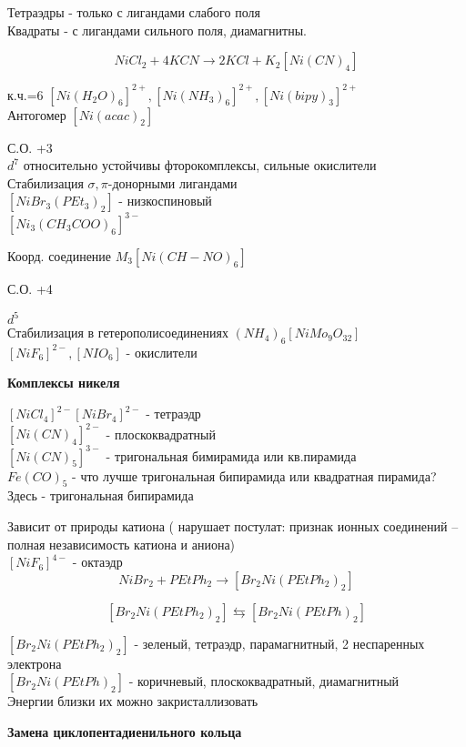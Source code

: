 Тетраэдры - только с лигандами слабого поля\\
Квадраты - с лигандами сильного поля, диамагнитны.

$$NiCl_2 + 4KCN \rightarrow 2KCl + K_2[Ni(CN)_4]$$

к.ч.=6 $[Ni(H_2O)_6]^{2+}, [Ni(NH_3)_6]^{2+}, [Ni(bipy)_3]^{2+}$\\
Антогомер $[Ni(acac)_2]$

С.О. +3\\
$d^7$ относительно устойчивы фторокомплексы, сильные окислители\\
Стабилизация $\sigma,\pi$-донорными лигандами\\
$[NiBr_3(PEt_3)_2]$ - низкоспиновый\\
$[Ni_3(CH_3COO)_6]^{3-}$

Коорд. соединение $M_3[Ni(CH-NO)_6]$

С.О.  +4

$d^5$\\
Стабилизация в гетерополисоединениях $(NH_4)_6[NiMo_9O_{32}]$\\
$[NiF_6]^{2-},  [NIO_6]$ - окислители

\textbf{Комплексы никеля}

$[NiCl_4]^{2-} [NiBr_4]^{2-}$  - тетраэдр\\
$[Ni(CN)_4]^{2-}$ - плоскоквадратный\\
$[Ni(CN)_5]^{3-}$ - тригональная бимирамида или кв.пирамида\\
$Fe(CO)_5$ - что лучше тригональная бипирамида или квадратная пирамида? Здесь - тригональная бипирамида

Зависит от природы катиона ( нарушает постулат:  признак ионных соединений -- полная независимость катиона и аниона)\\

$[NiF_6]^{4-}$ - октаэдр\\

$$NiBr_2 + PEtPh_2 \rightarrow [Br_2Ni(PEtPh_2)_2]$$

$$[Br_2Ni(PEtPh_2)_2] \leftrightarrows [Br_2Ni(PEtPh)_2]$$

$[Br_2Ni(PEtPh_2)_2]$ - зеленый, тетраэдр, парамагнитный, 2 неспаренных электрона\\

$[Br_2Ni(PEtPh)_2]$ - коричневый, плоскоквадратный, диамагнитный\\

Энергии близки их можно закристаллизовать

\textbf{Замена циклопентадиенильного кольца}

